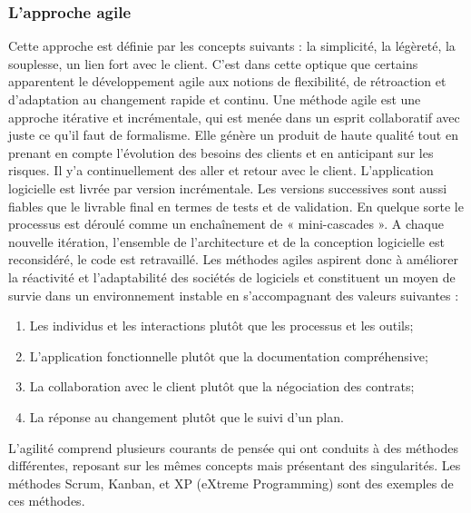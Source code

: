 \subsubsection{L'approche agile}
Cette approche est définie par les concepts suivants : la simplicité, la légèreté, la souplesse, un lien fort avec le client. C’est dans cette optique que certains apparentent le développement agile aux notions de flexibilité, de rétroaction et d’adaptation au changement rapide et continu.
\newline
Une méthode agile est une approche itérative et incrémentale, qui est menée dans un esprit collaboratif avec juste ce qu’il faut de formalisme. Elle génère un produit de haute qualité tout en prenant en compte l’évolution des besoins des clients et en anticipant sur les risques. Il y’a continuellement des aller et retour avec le client. L’application logicielle est livrée par version incrémentale. Les versions successives sont aussi fiables que le livrable final en termes de tests et de validation. En quelque sorte le processus est déroulé comme un enchaînement de « mini-cascades ». A chaque nouvelle itération, l’ensemble de l’architecture et de la conception logicielle est reconsidéré, le code est retravaillé.
\newline
Les méthodes agiles aspirent donc à améliorer la réactivité et l’adaptabilité des sociétés de logiciels et constituent un moyen de survie dans un environnement instable en s’accompagnant des valeurs suivantes :
\begin{enumerate}
	\item Les individus et les interactions plutôt que les processus et les outils;
	\item L’application fonctionnelle plutôt que la documentation compréhensive;
	\item La collaboration avec le client plutôt que la négociation des contrats;
	\item La réponse au changement plutôt que le suivi d’un plan.
	\newline
\end{enumerate}
L’agilité comprend plusieurs courants de pensée qui ont conduits à des méthodes différentes, reposant sur les mêmes concepts mais présentant des singularités. Les méthodes Scrum, Kanban, et XP (eXtreme Programming) sont des exemples de ces méthodes.
\newline\newline


